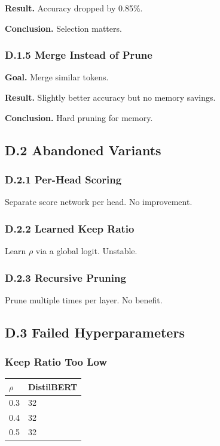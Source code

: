{\textbf{Result.} Accuracy dropped by 0.85\%.

\textbf{Conclusion.} Selection matters.

\subsubsection{D.1.5 Merge Instead of Prune}

\textbf{Goal.} Merge similar tokens.

\textbf{Result.} Slightly better accuracy but no memory savings.

\textbf{Conclusion.} Hard pruning for memory.

\subsection{D.2 Abandoned Variants}

\subsubsection{D.2.1 Per-Head Scoring}

Separate score network per head. No improvement.

\subsubsection{D.2.2 Learned Keep Ratio}

Learn $\rho$ via a global logit. Unstable.

\subsubsection{D.2.3 Recursive Pruning}

Prune multiple times per layer. No benefit.

\subsection{D.3 Failed Hyperparameters}

\subsubsection{Keep Ratio Too Low}
\begin{table}[H]
\centering
\small
\begin{tabular}{ll}
\toprule
\textbf{$\rho$} & \textbf{DistilBERT} \\
\midrule
0.3 & 32 \\
0.4 & 32 \\
0.5 & 32 \\
\bottomrule
\end{tabular}
\end{table}

}
